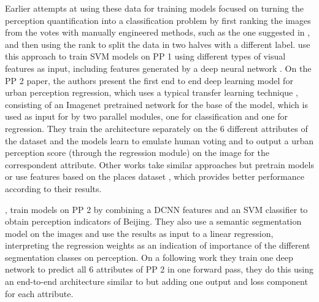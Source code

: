 Earlier attempts at using these data for training models focused on turning the perception quantification into a classification problem
by first ranking the images from the votes with manually engineered methods, such as the one suggested in
, and then using the rank to split the data in two halves with a different
label.  use this approach to train SVM models on PP 1 using different types of visual features as input,
including features generated by a  deep neural network \cite{donahue_deep}. On the PP 2 paper, the authors present the first end to end deep learning model for
urban perception regression, which uses a typical transfer learning technique \cite{survey_transfer}, consisting of an
Imagenet \cite{imagenet} pretrained  network for the base of the model, which is used as input
for by two parallel modules, one for classification and one for regression. They train the architecture
separately on the 6 different attributes of the dataset and the models learn to emulate human voting and
to output a urban perception score (through the regression module) on the image for the correspondent attribute.
Other works \cite{porzi_predicting, santani} take similar approaches but pretrain models or use features based on
the places dataset \cite{zhou_places}, which provides better performance according to their results.


, train models on PP 2 by combining a DCNN features and an SVM classifier to
obtain perception indicators of Beijing. They also use a semantic segmentation model \cite{cordts_cityscapes} on the images and use the results
as input to a linear regression, interpreting the regression weights as an indication of importance of the different segmentation
classes on perception. On a following work \cite{zhang_uncovering} they train one deep network to predict all 6 attributes of PP 2
in one forward pass, they do this using an end-to-end architecture similar to  but adding
one output and loss component for each attribute.

